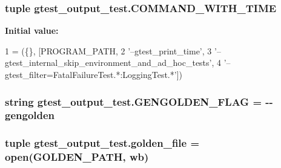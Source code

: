 \subsubsection[{C\+O\+M\+M\+A\+N\+D\+\_\+\+W\+I\+T\+H\+\_\+\+T\+I\+M\+E}]{\setlength{\rightskip}{0pt plus 5cm}tuple gtest\+\_\+output\+\_\+test.\+C\+O\+M\+M\+A\+N\+D\+\_\+\+W\+I\+T\+H\+\_\+\+T\+I\+M\+E}\label{namespacegtest__output__test_a1c27d93a57990d21461436f2d5ff3064}
{\bfseries Initial value\+:}
\begin{DoxyCode}
1 = (\{\}, [PROGRAM\_PATH,
2                           \textcolor{stringliteral}{'--gtest\_print\_time'},
3                           \textcolor{stringliteral}{'--gtest\_internal\_skip\_environment\_and\_ad\_hoc\_tests'},
4                           \textcolor{stringliteral}{'--gtest\_filter=FatalFailureTest.*:LoggingTest.*'}])
\end{DoxyCode}
\hypertarget{namespacegtest__output__test_a25addad68fc28461f31e7f473bb7643f}{}
\subsubsection[{G\+E\+N\+G\+O\+L\+D\+E\+N\+\_\+\+F\+L\+A\+G}]{\setlength{\rightskip}{0pt plus 5cm}string gtest\+\_\+output\+\_\+test.\+G\+E\+N\+G\+O\+L\+D\+E\+N\+\_\+\+F\+L\+A\+G = \textquotesingle{}-\/-\/gengolden\textquotesingle{}}\label{namespacegtest__output__test_a25addad68fc28461f31e7f473bb7643f}
\hypertarget{namespacegtest__output__test_ae163d7a6ccbd6e49abe6982a89c3bca9}{}
\subsubsection[{golden\+\_\+file}]{\setlength{\rightskip}{0pt plus 5cm}tuple gtest\+\_\+output\+\_\+test.\+golden\+\_\+file = open({\bf G\+O\+L\+D\+E\+N\+\_\+\+P\+A\+T\+H}, \textquotesingle{}wb\textquotesingle{})}\label{namespacegtest__output__test_ae163d7a6ccbd6e49abe6982a89c3bca9}
\hypertarget{namespacegtest__output__test_a317ece7d11d9103a7bdbf0320b64a981}{}
